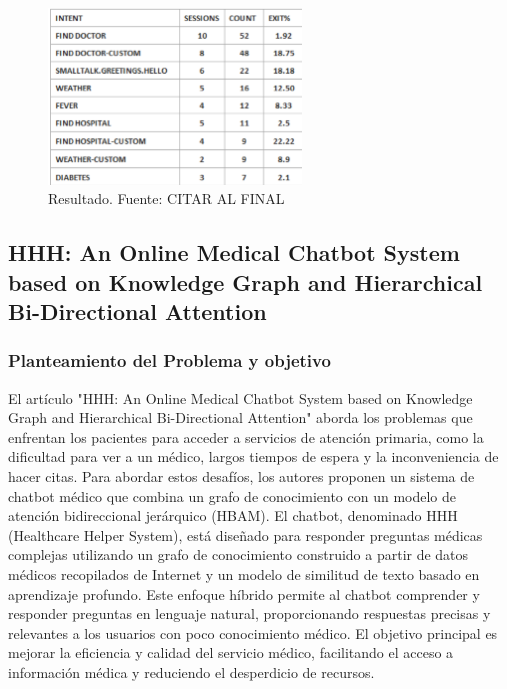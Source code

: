 \begin{figure}[h]
	\begin{center}
		\includegraphics[width=0.6\textwidth]{2/1_antecedentes/Resultado-4.png}
		\caption{Resultado. Fuente: CITAR AL FINAL }
	\end{center}
\end{figure}

\subsection{HHH: An Online Medical Chatbot System based on Knowledge Graph and Hierarchical Bi-Directional Attention} %
	\subsubsection{Planteamiento del Problema y objetivo}
		El artículo "HHH: An Online Medical Chatbot System based on Knowledge Graph and Hierarchical Bi-Directional Attention" aborda los problemas que enfrentan los pacientes para acceder a servicios de atención primaria, como la dificultad para ver a un médico, largos tiempos de espera y la inconveniencia de hacer citas. Para abordar estos desafíos, los autores proponen un sistema de chatbot médico que combina un grafo de conocimiento con un modelo de atención bidireccional jerárquico (HBAM). El chatbot, denominado HHH (Healthcare Helper System), está diseñado para responder preguntas médicas complejas utilizando un grafo de conocimiento construido a partir de datos médicos recopilados de Internet y un modelo de similitud de texto basado en aprendizaje profundo. Este enfoque híbrido permite al chatbot comprender y responder preguntas en lenguaje natural, proporcionando respuestas precisas y relevantes a los usuarios con poco conocimiento médico. El objetivo principal es mejorar la eficiencia y calidad del servicio médico, facilitando el acceso a información médica y reduciendo el desperdicio de recursos.

